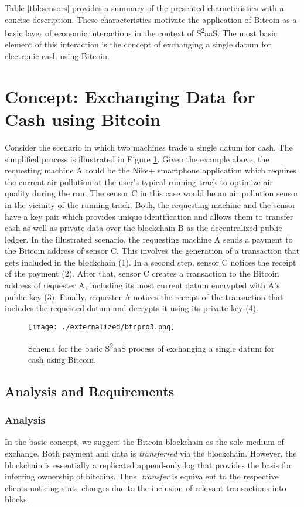 Table \ref{tbl:sensors} provides a summary of the presented characteristics with a concise description. These characteristics motivate the application of Bitcoin as a basic layer of economic interactions in the context of S\textsuperscript{2}aaS. The most basic element of this interaction is the concept of exchanging a single datum for electronic cash using Bitcoin.

\section{Concept: Exchanging Data for Cash using Bitcoin}
\label{sec:s2aas_concept}

Consider the scenario in which two machines trade a single datum for cash. The simplified process is illustrated in Figure \ref{fig:btcDataExchange}. Given the example above, the requesting machine A could be the Nike+ smartphone application which requires the current air pollution at the user's typical running track to optimize air quality during the run. The sensor C in this case would be an air pollution sensor in the vicinity of the running track. Both, the requesting machine and the sensor have a key pair which provides unique identification and allows them to transfer cash as well as private data over the blockchain B as the decentralized public ledger. 
In the illustrated scenario, the requesting machine A sends a payment to the Bitcoin address of sensor C. This involves the generation of a transaction that gets included in the blockchain (1). In a second step, sensor C notices the receipt of the payment (2). After that, sensor C creates a transaction to the Bitcoin address of requester A, including its most current datum encrypted with A's public key (3). Finally, requester A notices the receipt of the transaction that includes the requested datum and decrypts it using its private key (4).

\begin{figure}
\centering
\texttt{[image: ./externalized/btcpro3.png]}
\caption{Schema for the basic S\textsuperscript{2}aaS process of exchanging a single datum for cash using Bitcoin.}
\label{fig:btcDataExchange}
\end{figure}

\subsection{Analysis and Requirements}
\label{sec:s2aas_analysis}

\subsubsection{Analysis}
In the basic concept, we suggest the Bitcoin blockchain as the sole medium of exchange. Both payment and data is \emph{transferred} via the blockchain. However, the blockchain is essentially a replicated append-only log that provides the basis for inferring ownership of bitcoins. Thus, \emph{transfer} is equivalent to the respective clients noticing state changes due to the inclusion of relevant transactions into blocks.


